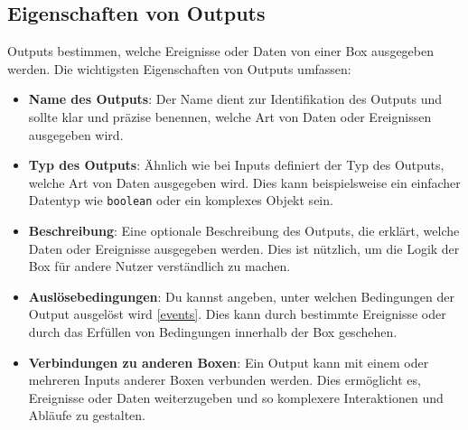 \subsection{Eigenschaften von Outputs}
Outputs bestimmen, welche Ereignisse oder Daten von einer Box ausgegeben werden. Die wichtigsten Eigenschaften von Outputs umfassen:
\begin{itemize}
    \item \textbf{Name des Outputs}: Der Name dient zur Identifikation des Outputs und sollte klar und präzise benennen, welche Art von Daten oder Ereignissen ausgegeben wird.
    \item \textbf{Typ des Outputs}: Ähnlich wie bei Inputs definiert der Typ des Outputs, welche Art von Daten ausgegeben wird. Dies kann beispielsweise ein einfacher Datentyp wie \texttt{boolean} oder ein komplexes Objekt sein.
    \item \textbf{Beschreibung}: Eine optionale Beschreibung des Outputs, die erklärt, welche Daten oder Ereignisse ausgegeben werden. Dies ist nützlich, um die Logik der Box für andere Nutzer verständlich zu machen.
    \item \textbf{Auslösebedingungen}: Du kannst angeben, unter welchen Bedingungen der Output ausgelöst wird \ref{events}. Dies kann durch bestimmte Ereignisse oder durch das Erfüllen von Bedingungen innerhalb der Box geschehen.
    \item \textbf{Verbindungen zu anderen Boxen}: Ein Output kann mit einem oder mehreren Inputs anderer Boxen verbunden werden. Dies ermöglicht es, Ereignisse oder Daten weiterzugeben und so komplexere Interaktionen und Abläufe zu gestalten.
\end{itemize}

